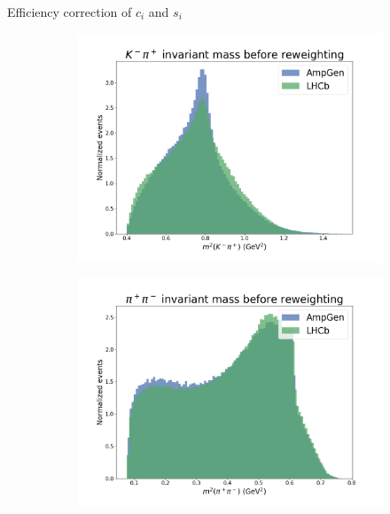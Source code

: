 \documentclass{beamer}
\begin{document}
\begin{frame}{Efficiency correction of $c_i$ and $s_i$}
\begin{figure}
\begin{subfigure}{0.33\textwidth}
    \end{subfigure}%
    \begin{subfigure}{0.33\textwidth}
      \includegraphics[width = 1.0\textwidth]{Plots/s12_BeforeReweighting.png}
    \end{subfigure}
    \begin{subfigure}{0.33\textwidth}
      \includegraphics[width = 1.0\textwidth]{Plots/s23_BeforeReweighting.png}
    \end{subfigure}%
    \begin{subfigure}{0.33\textwidth}

\end{subfigure}
\end{figure}
\end{frame}
\end{document}
